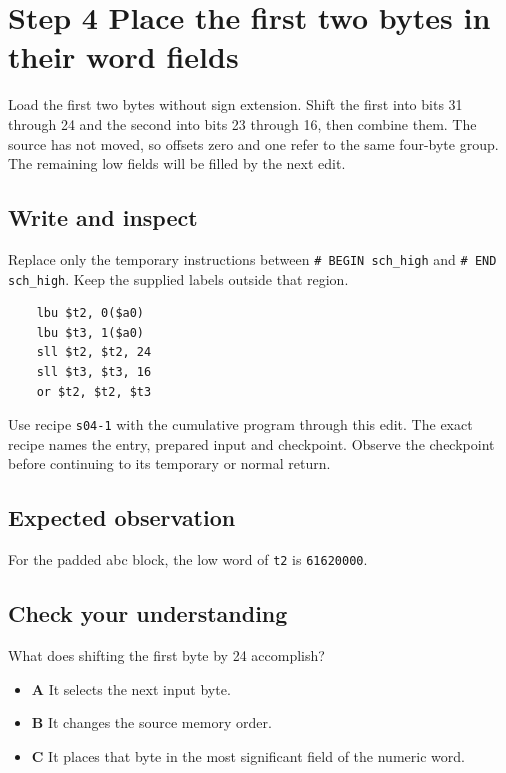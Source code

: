 \section{Step 4 Place the first two bytes in their word fields}\label{sha-s04}

Load the first two bytes without sign extension. Shift the first into bits 31 through 24 and the second into bits 23 through 16, then combine them. The source has not moved, so offsets zero and one refer to the same four-byte group. The remaining low fields will be filled by the next edit.

\subsection{Write and inspect}
Replace only the temporary instructions between \texttt{\# BEGIN sch\_high} and \texttt{\# END sch\_high}. Keep the supplied labels outside that region.

\begin{verbatim}
    lbu $t2, 0($a0)
    lbu $t3, 1($a0)
    sll $t2, $t2, 24
    sll $t3, $t3, 16
    or $t2, $t2, $t3
\end{verbatim}

Use recipe \texttt{s04-1} with the cumulative program through this edit. The exact recipe names the entry, prepared input and checkpoint. Observe the checkpoint before continuing to its temporary or normal return.

\subsection{Expected observation}
For the padded abc block, the low word of \texttt{t2} is \texttt{61620000}.

\subsection{Check your understanding}
What does shifting the first byte by 24 accomplish?

\begin{itemize}
  \item \textbf{A} It selects the next input byte.
  \item \textbf{B} It changes the source memory order.
  \item \textbf{C} It places that byte in the most significant field of the numeric word.
\end{itemize}
